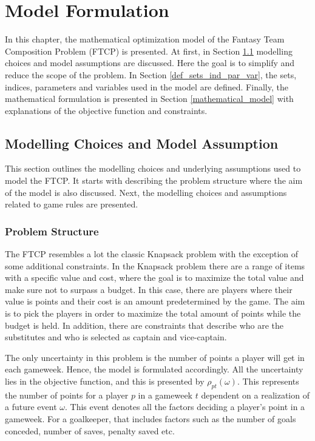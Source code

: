 
\chapter{Model Formulation} \label{model_formulation}

In this chapter, the mathematical optimization model of the Fantasy Team Composition Problem (FTCP) is presented. At first, in Section \ref{modelling choices_assumptions} modelling choices and model assumptions are discussed. Here the goal is to simplify and reduce the scope of the problem. In Section \ref{def_sets_ind_par_var}, the sets, indices, parameters and variables used in the model are defined. Finally, the mathematical formulation is presented in Section \ref{mathematical_model} with explanations of the objective function and constraints. 


\section{Modelling Choices and Model Assumption} \label{modelling choices_assumptions}

This section outlines the modelling choices and underlying assumptions used to model the FTCP. It starts with describing the problem structure where the aim of the model is also discussed. Next, the modelling choices and assumptions related to game rules are presented. 


\subsection{Problem Structure} \label{prob_struct}

The FTCP resembles a lot the classic Knapsack problem with the exception of some additional constraints. In the Knapsack problem there are a range of items with a specific value and cost, where the goal is to maximize the total value and make sure not to surpass a budget. In this case, there are players where their value is points and their cost is an amount predetermined by the game. The aim is to pick the players in order to maximize the total amount of points while the budget is held. In addition, there are constraints that describe who are the substitutes and who is selected as captain and vice-captain. 

\newpar

The only uncertainty in this problem is the number of points a player will get in each gameweek. Hence, the model is formulated accordingly. All the uncertainty lies in the objective function, and this is presented by $\rho_{pt}(\omega)$. This represents the number of points for a player $p$ in a gameweek $t$ dependent on a realization of a future event $\omega$. This event denotes all the factors deciding a player's point in a gameweek. For a goalkeeper, that includes factors such as the number of goals conceded, number of saves, penalty saved etc.

